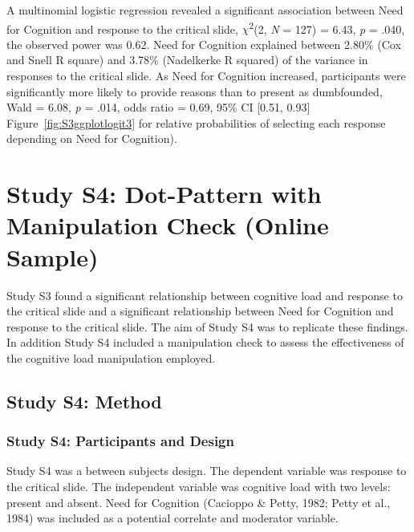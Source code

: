\documentclass[
  man,floatsintext]{apa6}
\begin{document}
\newpage

A multinomial logistic regression revealed a significant association between Need for Cognition and response to the critical slide, \(\chi\)\textsuperscript{2}(2, \emph{N} = 127) = 6.43, \emph{p} = .040, the observed power was 0.62. Need for Cognition explained between 2.80\% (Cox and Snell R square) and 3.78\% (Nadelkerke R squared) of the variance in responses to the critical slide. As Need for Cognition increased, participants were significantly more likely to provide reasons than to present as dumbfounded, Wald = 6.08, \emph{p} = .014, odds ratio = 0.69, 95\% CI {[}0.51, 0.93{]} Figure~\ref{fig:S3ggplotlogit3} for relative probabilities of selecting each response depending on Need for Cognition).

\newpage

\hypertarget{study-s4-dot-pattern-with-manipulation-check-online-sample}{%
\section{Study S4: Dot-Pattern with Manipulation Check (Online Sample)}\label{study-s4-dot-pattern-with-manipulation-check-online-sample}}

Study S3 found a significant relationship between cognitive load and response to the critical slide and a significant relationship between Need for Cognition and response to the critical slide. The aim of Study S4 was to replicate these findings. In addition Study S4 included a manipulation check to assess the effectiveness of the cognitive load manipulation employed.

\hypertarget{study-s4-method}{%
\subsection{Study S4: Method}\label{study-s4-method}}

\hypertarget{study-s4-participants-and-design}{%
\subsubsection{Study S4: Participants and Design}\label{study-s4-participants-and-design}}

Study S4 was a between subjects design. The dependent variable was response to the critical slide. The independent variable was cognitive load with two levels: present and absent. Need for Cognition (Cacioppo \& Petty, 1982; Petty et al., 1984) was included as a potential correlate and moderator variable.
\end{document}
